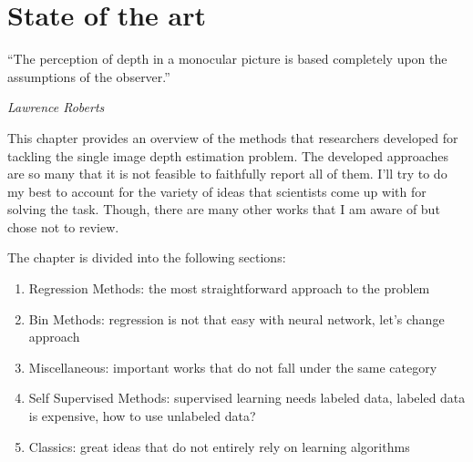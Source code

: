 \chapter{State of the art}
\label{c:sota}

\epigraph{\enquote{The perception of depth in a monocular picture is based completely upon the assumptions of the observer.}}{\emph{Lawrence Roberts}}

This chapter provides an overview of the methods that researchers developed for tackling the single image depth estimation problem.
The developed approaches are so many that it is not feasible to faithfully report all of them.
I'll try to do my best to account for the variety of ideas that scientists come up with for solving the task.
Though, there are many other works that I am aware of but chose not to review.

The chapter is divided into the following sections:
\begin{enumerate}
    \item{Regression Methods: the most straightforward approach to the problem}
    \item{Bin Methods: regression is not that easy with neural network, let's change approach}
    \item{Miscellaneous: important works that do not fall under the same category}
    \item{Self Supervised Methods: supervised learning needs labeled data, labeled data is expensive, how to use unlabeled data?}
    \item{Classics: great ideas that do not entirely rely on learning algorithms}
\end{enumerate}









